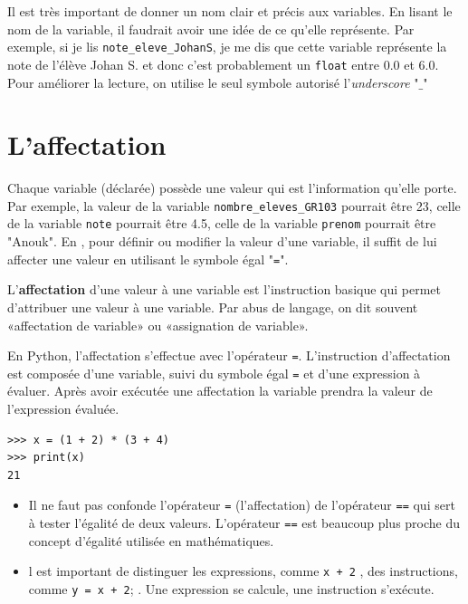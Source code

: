 \begin{eclairage}
	Il est très important de donner un nom clair et précis aux variables. En lisant le nom de la variable, il faudrait avoir une idée de ce qu'elle représente.
	Par exemple, si je lis \lstinline{note_eleve_JohanS}, je me dis que cette variable représente la note de l'élève Johan S. et donc c'est probablement un \lstinline{float} entre 0.0 et 6.0. Pour améliorer la lecture, on utilise le seul symbole autorisé l'\textit{underscore} "$\_$"\\
\end{eclairage}


\section{L'affectation}
Chaque variable (déclarée) possède une valeur qui est l’information qu’elle porte. Par exemple, la valeur de la variable \lstinline{nombre_eleves_GR103} pourrait être 23, celle de la variable \lstinline{note} pourrait être 4.5, celle de la variable \lstinline{prenom} pourrait être "Anouk".
En \py, pour définir ou modifier la valeur d’une variable, il suffit de lui affecter une valeur en utilisant le symbole égal "\lstinline{=}". 
\begin{mydefinition}
	L’\textbf{affectation} d’une valeur à une variable est l’instruction basique qui permet d’attribuer une valeur à une variable. Par abus de langage, on dit souvent «affectation de variable» ou «assignation de variable».
\end{mydefinition}
En Python, l'affectation s’effectue avec l’opérateur \lstinline{=}. L'instruction d'affectation est composée d'une variable, suivi du symbole égal  \lstinline{=} et d'une expression à évaluer. Après avoir exécutée une affectation la variable prendra la valeur de l'expression évaluée.
\begin{myexample}
	\vspace*{-10px}
	\begin{lstlisting}[numbers=none]
>>> x = (1 + 2) * (3 + 4)
>>> print(x)
21
	\end{lstlisting}\vspace*{-10px}
\end{myexample}

\begin{important}
	\begin{itemize}
		\item 	Il ne faut pas confonde l'opérateur \lstinline{=} (l'affectation) de  l'opérateur \lstinline{==} qui sert à tester l'égalité de deux valeurs. L'opérateur \lstinline{==} est beaucoup plus proche du concept d'égalité utilisée en mathématiques.
		\item l est important de distinguer les expressions, comme \lstinline{x + 2} , des instructions, comme \lstinline{y = x + 2}; . Une expression se calcule, une instruction s’exécute.
	\end{itemize}
	
\end{important}


